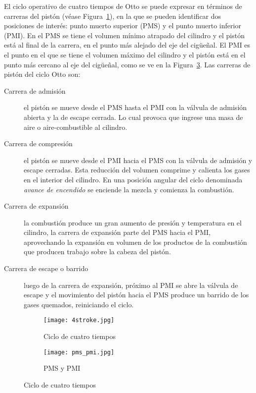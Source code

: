 El ciclo operativo de cuatro tiempos de Otto se puede expresar en términos de
carreras del pistón (véase Figura~\ref{fig:4tiempos}), en la que se pueden identificar dos
posiciones de interés: punto muerto superior (PMS) y el punto muerto inferior
(PMI).
%
En el PMS se tiene el volumen mínimo atrapado del cilindro y el pistón está al
final de la carrera, en el punto más alejado del eje del cigüeñal.
%
El PMI es el punto en el que se tiene el volumen máximo del cilindro y el pistón
está en el punto más cercano al eje del cigüeñal, como se ve en la
Figura~\ref{fig:pms_pmi}.
%
Las carreras de pistón del ciclo Otto son:
%
\begin{description}
%
    \item [Carrera de admisión] el pistón se mueve desde el PMS hasta el PMI con
        la válvula de admisión abierta y la de escape cerrada.
        Lo cual provoca que ingrese una masa de aire o aire-combustible al cilindro.
%
    \item [Carrera de compresión] el pistón se mueve desde el PMI hacia el PMS
        con la válvula de admisión y escape cerradas.
        Esta reducción del volumen comprime y calienta los gases en el interior
del cilindro.
        En una posición angular del ciclo denominada \emph{avance de encendido}
se enciende la mezcla y comienza la combustión.
%
    \item [Carrera de expansión] la combustión produce un gran
aumento de presión y temperatura en el cilindro, la carrera de expansión parte
del PMS hacia el PMI, aprovechando la expansión en volumen de los productos de
la combustión que producen trabajo sobre la cabeza del pistón.
%
    \item [Carrera de escape o barrido] luego de la carrera de expansión,
próximo al PMI se abre la válvula de escape y el movimiento del pistón hacia el
PMS produce un barrido de los gases quemados, reiniciando el ciclo.
%
\end{description}

\begin{figure}
  \centering
  \begin{subfigure}{0.6\textwidth}
    \centering
    \texttt{[image: 4stroke.jpg]}
    \caption{Ciclo de cuatro tiempos}\label{fig:4tiempos} %
  \end{subfigure}%
  \begin{subfigure}{0.4\textwidth}
    \centering
    \texttt{[image: pms\_pmi.jpg]}
    \caption{PMS y PMI}\label{fig:pms_pmi}
  \end{subfigure}
  \caption{Ciclo de cuatro tiempos}
\end{figure}

